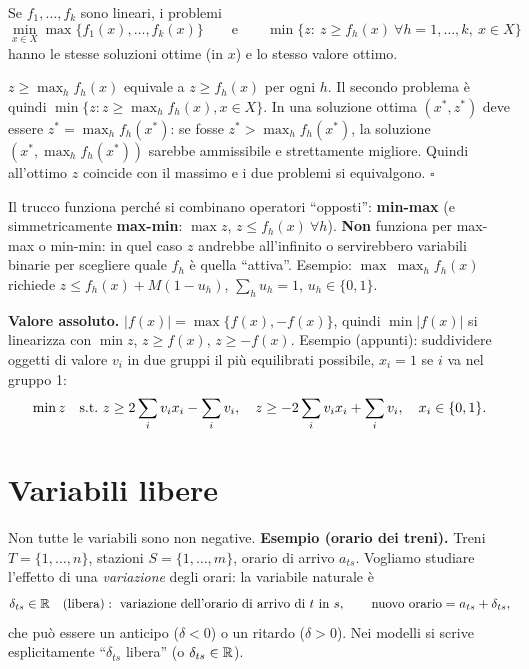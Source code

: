 \begin{prop}
Se $f_1,\dots,f_k$ sono lineari, i problemi
\[ \min_{x\in X}\max\{f_1(x),\dots,f_k(x)\}\qquad\text{e}\qquad \min\{z:\ z\ge f_h(x)\ \forall h=1,\dots,k,\ x\in X\} \]
hanno le stesse soluzioni ottime (in $x$) e lo stesso valore ottimo.
\end{prop}
\begin{dimo}
$z\ge\max_h f_h(x)$ equivale a $z\ge f_h(x)$ per ogni $h$. Il secondo problema è quindi $\min\{z: z\ge\max_hf_h(x), x\in X\}$. In una soluzione ottima $(x^*,z^*)$ deve essere $z^*=\max_hf_h(x^*)$: se fosse $z^*>\max_hf_h(x^*)$, la soluzione $(x^*,\max_hf_h(x^*))$ sarebbe ammissibile e strettamente migliore. Quindi all'ottimo $z$ coincide con il massimo e i due problemi si equivalgono. \hfill$\square$
\end{dimo}

\begin{esame}
Il trucco funziona perché si combinano operatori ``opposti'': \textbf{min-max} (e simmetricamente \textbf{max-min}: $\max z$, $z\le f_h(x)\ \forall h$). \textbf{Non} funziona per max-max o min-min: in quel caso $z$ andrebbe all'infinito o servirebbero variabili binarie per scegliere quale $f_h$ è quella ``attiva''. Esempio: $\max\ \max_h f_h(x)$ richiede $z\le f_h(x)+M(1-u_h)$, $\sum_h u_h=1$, $u_h\in\{0,1\}$.
\end{esame}

\textbf{Valore assoluto.} $|f(x)|=\max\{f(x),-f(x)\}$, quindi $\min |f(x)|$ si linearizza con $\min z$, $z\ge f(x)$, $z\ge -f(x)$. Esempio (appunti): suddividere oggetti di valore $v_i$ in due gruppi il più equilibrati possibile, $x_i=1$ se $i$ va nel gruppo 1:
\[ \min z\quad \text{s.t.}\ z\ge 2\sum_iv_ix_i-\sum_iv_i,\quad z\ge -2\sum_iv_ix_i+\sum_iv_i,\quad x_i\in\{0,1\}. \]

\section{Variabili libere}\label{sec:libere}

Non tutte le variabili sono non negative. \textbf{Esempio (orario dei treni).} Treni $T=\{1,\dots,n\}$, stazioni $S=\{1,\dots,m\}$, orario di arrivo $a_{ts}$. Vogliamo studiare l'effetto di una \emph{variazione} degli orari: la variabile naturale è
\[ \delta_{ts}\in\mathbb{R} \quad(\text{libera}):\ \text{variazione dell'orario di arrivo di } t \text{ in } s,\qquad \text{nuovo orario}=a_{ts}+\delta_{ts}, \]
che può essere un anticipo ($\delta<0$) o un ritardo ($\delta>0$). Nei modelli si scrive esplicitamente ``$\delta_{ts}$ libera'' (o $\delta_{ts}\in\mathbb{R}$).

